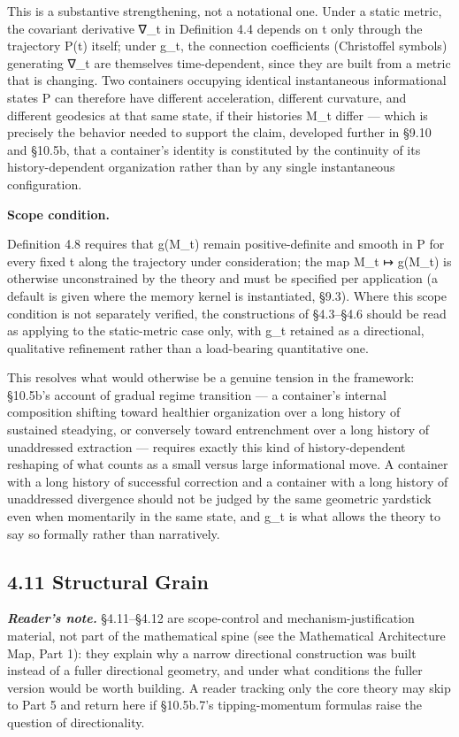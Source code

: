 \documentclass[
]{article}
\begin{document}
This is a substantive strengthening, not a notational one. Under a
static metric, the covariant derivative ∇\_t in Definition 4.4 depends
on t only through the trajectory P(t) itself; under g\_t, the connection
coefficients (Christoffel symbols) generating ∇\_t are themselves
time-dependent, since they are built from a metric that is changing. Two
containers occupying identical instantaneous informational states P can
therefore have different acceleration, different curvature, and
different geodesics at that same state, if their histories M\_t differ
--- which is precisely the behavior needed to support the claim,
developed further in §9.10 and §10.5b, that a container's identity is
constituted by the continuity of its history-dependent organization
rather than by any single instantaneous configuration.

\textbf{Scope condition.}

Definition 4.8 requires that g(M\_t) remain positive-definite and smooth
in P for every fixed t along the trajectory under consideration; the map
M\_t ↦ g(M\_t) is otherwise unconstrained by the theory and must be
specified per application (a default is given where the memory kernel is
instantiated, §9.3). Where this scope condition is not separately
verified, the constructions of §4.3--§4.6 should be read as applying to
the static-metric case only, with g\_t retained as a directional,
qualitative refinement rather than a load-bearing quantitative one.

This resolves what would otherwise be a genuine tension in the
framework: §10.5b's account of gradual regime transition --- a
container's internal composition shifting toward healthier organization
over a long history of sustained steadying, or conversely toward
entrenchment over a long history of unaddressed extraction --- requires
exactly this kind of history-dependent reshaping of what counts as a
small versus large informational move. A container with a long history
of successful correction and a container with a long history of
unaddressed divergence should not be judged by the same geometric
yardstick even when momentarily in the same state, and g\_t is what
allows the theory to say so formally rather than narratively.

\hypertarget{structural-grain}{%
\subsection{4.11 Structural Grain}\label{structural-grain}}

\emph{\textbf{Reader's note.}} §4.11--§4.12 are scope-control and
mechanism-justification material, not part of the mathematical spine
(see the Mathematical Architecture Map, Part 1): they explain why a
narrow directional construction was built instead of a fuller
directional geometry, and under what conditions the fuller version would
be worth building. A reader tracking only the core theory may skip to
Part 5 and return here if §10.5b.7's tipping-momentum formulas raise the
question of directionality.
\end{document}
